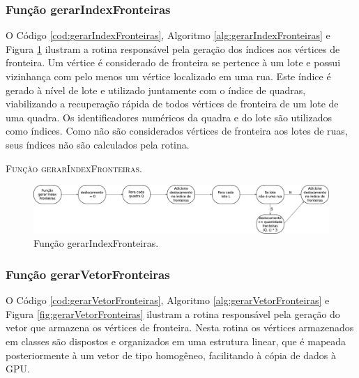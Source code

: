 \newpage

\subsubsection{Função gerarIndexFronteiras}

O Código \ref{cod:gerarIndexFronteiras}, Algoritmo \ref{alg:gerarIndexFronteiras} e Figura \ref{fig:gerarIndexFronteiras} ilustram a rotina responsável pela geração dos índices aos vértices de fronteira. Um vértice é considerado de fronteira se pertence à um lote e possui vizinhança com pelo menos um vértice localizado em uma rua. Este índice é gerado à nível de lote e utilizado juntamente com o índice de quadras, viabilizando a recuperação rápida de todos vértices de fronteira de um lote de uma quadra. Os identificadores numéricos da quadra e do lote são utilizados como índices. Como não são considerados vértices de fronteira aos lotes de ruas, seus índices não são calculados pela rotina. 



\begin{algorithm}[H]
   \SetAlgoLined   
   
   \caption{\textsc{Função gerarIndexFronteiras.}}
   \label{alg:gerarIndexFronteiras}
\end{algorithm}

\begin{figure}[H]
  \centering
  \includegraphics[width=1\textwidth]{Figuras/Simula/Fluxos/gerarIndexFronteiras.eps}
  \caption{Função gerarIndexFronteiras.}
  \label{fig:gerarIndexFronteiras}
\end{figure} 

\newpage

\subsubsection{Função gerarVetorFronteiras}

O Código \ref{cod:gerarVetorFronteiras}, Algoritmo \ref{alg:gerarVetorFronteiras} e Figura \ref{fig:gerarVetorFronteiras} ilustram a rotina responsável pela geração do vetor que armazena os vértices de fronteira. Nesta rotina os vértices armazenados em classes são dispostos e organizados em uma estrutura linear, que é mapeada posteriormente à um vetor de tipo homogêneo, facilitando à cópia de dados à GPU.

